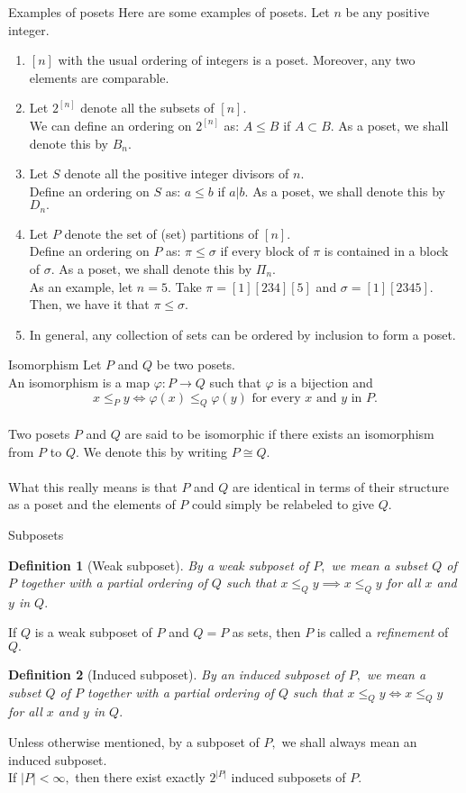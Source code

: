 \documentclass[handout, aspectratio=169]{beamer}
\newtheorem{defn}{Definition}
\begin{document}
\begin{frame}{Examples of posets}
	Here are some examples of posets. Let $n$ be any positive integer.
	\begin{enumerate} 
		\item $[n]$ with the usual ordering of integers is a poset. Moreover, any two elements are comparable.
		\item Let $2^{[n]}$ denote all the subsets of $[n].$\\
		We can define an ordering on $2^{[n]}$ as: $A \le B$ if $A \subset B.$ As a poset, we shall denote this by $B_n.$
		\item Let $S$ denote all the positive integer divisors of $n.$\\
		Define an ordering on $S$ as: $a \le b$ if $a | b.$ As a poset, we shall denote this by $D_n.$
		\item Let $P$ denote the set of (set) partitions of $[n].$ \\
		Define an ordering on $P$ as: $\pi \le \sigma$ if every block of $\pi$ is contained in a block of $\sigma.$ As a poset, we shall denote this by $\Pi_n.$\\
		As an example, let $n = 5.$ Take $\pi = [1][234][5]$ and $\sigma = [1][2345].$ Then, we have it that $\pi \le \sigma.$
		\item In general, any collection of sets can be ordered by inclusion to form a poset.
	\end{enumerate}
\end{frame}
\begin{frame}{Isomorphism}
	Let $P$ and $Q$ be two posets.\\
	An isomorphism is a map $\varphi:P \to Q$ such that $\varphi$ is a bijection and 
	\[x \le_P y \iff \varphi(x) \le_Q \varphi(y)\text{ for every }x\text{ and }y\text{ in }P.\]\\
	Two posets $P$ and $Q$ are said to be isomorphic if there exists an isomorphism from $P$ to $Q.$ We denote this by writing $P \cong Q.$\\~\\
	What this really means is that $P$ and $Q$ are identical in terms of their structure as a poset and the elements of $P$ could simply be relabeled to give $Q.$
\end{frame}
\begin{frame}{Subposets}
	\begin{defn}[Weak subposet]
		By a weak subposet of $P,$ we mean a subset $Q$ of $P$ together with a partial ordering of $Q$ such that $x \le_Q y \implies x \le_Q y$ for all $x$ and $y$ in $Q.$
	\end{defn}
	If $Q$ is a weak subposet of $P$ and $Q = P$ as sets, then $P$ is called a \emph{refinement} of $Q.$
	\begin{defn}[Induced subposet]
		By an induced subposet of $P,$ we mean a subset $Q$ of $P$ together with a partial ordering of $Q$ such that $x \le_Q y \iff x \le_Q y$ for all $x$ and $y$ in $Q.$
	\end{defn}
	Unless otherwise mentioned, by a subposet of $P,$ we shall always mean an induced subposet.\\
	If $|P| < \infty,$ then there exist exactly $2^{|P|}$ induced subposets of $P.$
\end{frame}
\end{document}

